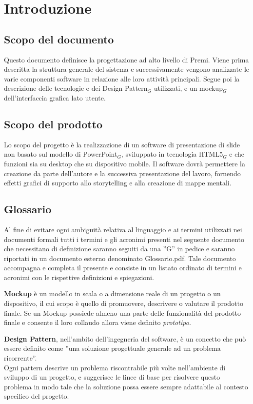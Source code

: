 \section{Introduzione}
\subsection{Scopo del documento}
Questo documento definisce la progettazione ad alto livello di Premi. Viene prima descritta la struttura generale del sistema e successivamente vengono analizzate le varie componenti software in relazione alle loro attività principali. Segue poi la descrizione delle tecnologie e dei Design Pattern$_{G}$ utilizzati, e un mockup$_{G}$ dell'interfaccia grafica lato utente.

\subsection{Scopo del prodotto}
Lo scopo del progetto è la realizzazione di un software di presentazione di slide non basato sul modello di PowerPoint$_{G}$, sviluppato in tecnologia HTML5$_{G}$ e che funzioni sia su desktop che su dispositivo mobile. Il software dovrà permettere la creazione da parte dell'autore e la successiva presentazione del lavoro, fornendo effetti grafici di supporto allo storytelling e alla creazione di mappe mentali. 

\subsection{Glossario}
Al fine di evitare ogni ambiguità relativa al linguaggio e ai termini utilizzati nei documenti formali tutti i termini e gli acronimi presenti nel seguente documento che necessitano di definizione saranno seguiti da una ”G” in pedice e saranno riportati in un documento esterno denominato Glossario.pdf. Tale documento accompagna e completa il presente e consiste in un listato ordinato di termini e acronimi con le rispettive definizioni e spiegazioni.


\textbf{Mockup} è un modello in scala o a dimensione reale di un progetto o un dispositivo, il cui scopo è quello di promuovere, descrivere o valutare il prodotto finale. Se un Mockup possiede almeno una parte delle funzionalità del prodotto finale e consente il loro collaudo allora viene definito \textit{prototipo}.
	
\textbf{Design Pattern}, nell'ambito dell'ingegneria del software, è un concetto che può essere definito come ''una soluzione progettuale generale ad un problema ricorrente''. \\
Ogni pattern descrive un problema riscontrabile più volte nell'ambiente di sviluppo di un progetto, e suggerisce le linee di base per risolvere questo problema in modo tale che la soluzione possa essere sempre adattabile al contesto specifico del progetto.
	
	

